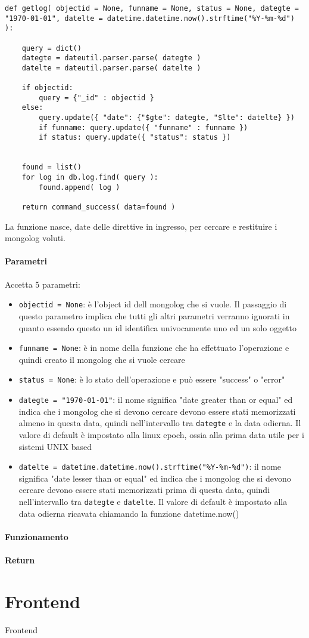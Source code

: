 \documentclass[11pt]{article}
\begin{document}
\subsubsection{}
\begin{lstlisting}
def getlog( objectid = None, funname = None, status = None, dategte = "1970-01-01", datelte = datetime.datetime.now().strftime("%Y-%m-%d") ):

    query = dict()
    dategte = dateutil.parser.parse( dategte )
    datelte = dateutil.parser.parse( datelte )

    if objectid:
        query = {"_id" : objectid }
    else:
        query.update({ "date": {"$gte": dategte, "$lte": datelte} })
        if funname: query.update({ "funname" : funname })
        if status: query.update({ "status": status })


    found = list()
    for log in db.log.find( query ):
        found.append( log )

    return command_success( data=found )
\end{lstlisting}
La funzione nasce, date delle direttive in ingresso, per cercare e restituire i mongolog voluti.
\paragraph{Parametri}
Accetta 5 parametri:
\begin{itemize}
	\item{\texttt{objectid = None}: è l'object id dell mongolog che si vuole. Il passaggio di questo parametro implica che tutti gli altri
		parametri verranno ignorati in quanto essendo questo un id identifica univocamente uno ed un solo oggetto}
	\item{\texttt{funname = None}: è in nome della funzione che ha effettuato l'operazione e quindi creato il mongolog che si vuole cercare}
	\item{\texttt{status = None}: è lo stato dell'operazione e può essere "success" o "error"}
	\item{\texttt{dategte = "1970-01-01"}: il nome significa "date greater than or equal" ed indica che i mongolog che si devono cercare
		devono essere stati memorizzati almeno in questa data, quindi nell'intervallo tra \texttt{dategte} e la data odierna.
		Il valore di default è impostato alla linux epoch, ossia alla prima data utile per i sistemi UNIX based}
	\item{\texttt{datelte = datetime.datetime.now().strftime("\%Y-\%m-\%d")}: il nome significa "date lesser than or equal" ed indica
		che i mongolog che si devono cercare devono essere stati memorizzati prima di questa data,
		quindi nell'intervallo tra \texttt{dategte} e \texttt{datelte}. Il valore di default è impostato alla data odierna ricavata
		chiamando la funzione datetime.now()}
\end{itemize}
\paragraph{Funzionamento}
\paragraph{Return}


\section{Frontend}\label{frontend}
Frontend
\end{document}
